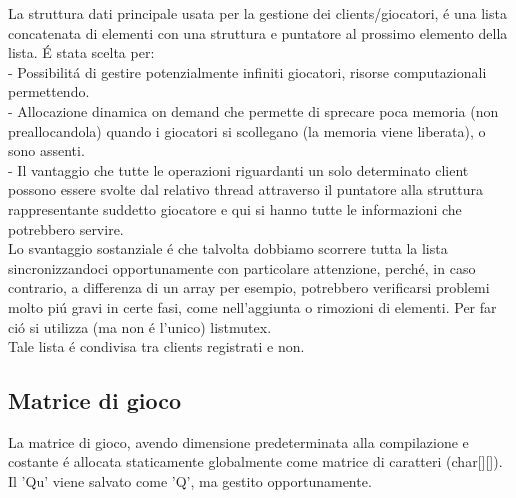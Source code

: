 La struttura dati principale usata per la gestione dei clients/giocatori, \'e una lista concatenata di elementi con una struttura e puntatore al prossimo elemento della lista. \'E stata scelta per:
 \\ - Possibilit\'a di gestire potenzialmente infiniti giocatori, risorse computazionali permettendo.
 \\ - Allocazione dinamica on demand che permette di sprecare poca memoria (non preallocandola) quando i giocatori si scollegano (la memoria viene liberata), o sono assenti.
 \\ - Il vantaggio che tutte le operazioni riguardanti un solo determinato client possono essere svolte dal relativo thread attraverso il puntatore alla struttura rappresentante suddetto giocatore e qui si hanno tutte le informazioni che potrebbero servire.
  \\
 Lo svantaggio sostanziale \'e che talvolta dobbiamo scorrere tutta la lista sincronizzandoci opportunamente con particolare attenzione, perch\'e, in caso contrario, a differenza di un array per esempio, potrebbero verificarsi problemi molto pi\'u gravi in certe fasi, come nell'aggiunta o rimozioni di elementi. Per far ci\'o si utilizza (ma non \'e l'unico) listmutex.
 \\
 Tale lista \'e condivisa tra clients registrati e non.
 \\
 
 
 \subsection{Matrice di gioco}
 \label{subsec:matricedigioco}

La matrice di gioco, avendo dimensione predeterminata alla compilazione e costante \'e allocata staticamente globalmente come matrice di caratteri (char[][]). Il 'Qu' viene salvato come 'Q', ma gestito opportunamente.
\\
